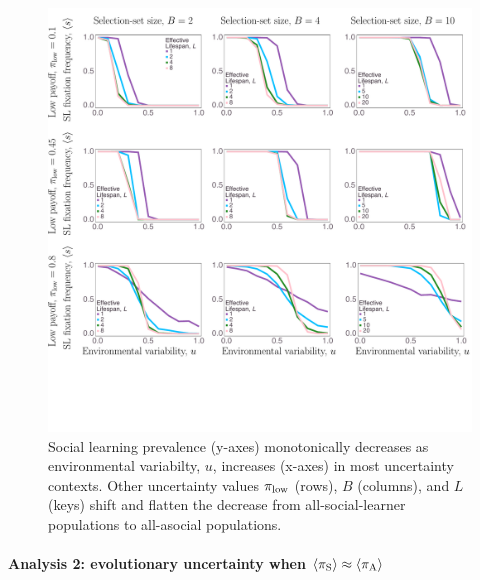 \documentclass[letterpaper,11.5pt]{scrartcl}
\begin{document}
\begin{figure}
  \caption{Social learning prevalence (y-axes) monotonically decreases as 
  environmental variabilty, $u$, increases (x-axes) in most uncertainty contexts. 
  Other uncertainty values $\pi_{\mathrm{low}}$ (rows), $B$ (columns), and $L$ (keys)
  shift and flatten the decrease from all-social-learner populations to all-asocial 
  populations.}
  \label{fig:mainResults}
  \centering
    \includegraphics[width=\textwidth]{Figures/mainResultsPlots.pdf}
\end{figure}


\paragraph{Analysis 2: evolutionary uncertainty when $\langle \pi_\mathrm{S} \rangle \approx \langle \pi_\mathrm{A} \rangle$}
\end{document}
